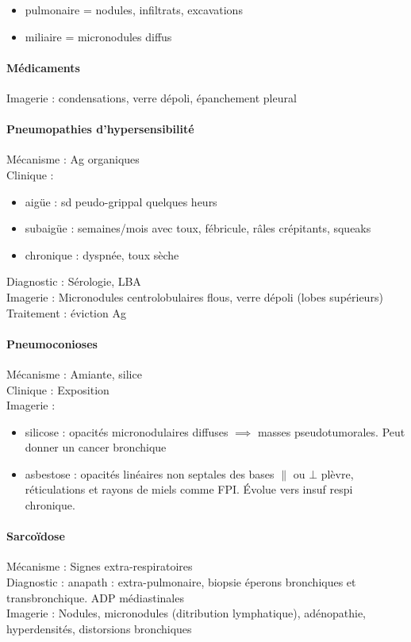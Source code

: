 \documentclass[11pt]{article}
\begin{document}
\begin{itemize}
\item pulmonaire = nodules, infiltrats, excavations
\item miliaire = micronodules diffus
\end{itemize}


\paragraph{Médicaments}
\label{sec:org24f3942}
Imagerie : condensations, verre dépoli, épanchement pleural

\paragraph{Pneumopathies d'hypersensibilité}
\label{sec:orgc0d3d24}
Mécanisme : Ag organiques\\
Clinique : 

\begin{itemize}
\item aigüe : sd peudo-grippal quelques heurs
\item subaigüe : semaines/mois avec toux, fébricule, râles crépitants, squeaks
\item chronique : dyspnée, toux sèche
\end{itemize}

Diagnostic : Sérologie, LBA\\
Imagerie : Micronodules centrolobulaires flous, verre dépoli (lobes supérieurs)\\
Traitement : éviction Ag

\paragraph{Pneumoconioses}
\label{sec:org73ecf2b}
Mécanisme : Amiante, silice\\
Clinique : Exposition\\
Imagerie : 

\begin{itemize}
\item silicose : opacités micronodulaires diffuses \(\implies\) masses pseudotumorales. Peut donner un cancer bronchique
\item asbestose : opacités linéaires non septales des bases \(\parallel\) ou \(\bot\) plèvre, réticulations et rayons de miels comme FPI. Évolue vers insuf respi chronique.
\end{itemize}


\paragraph{Sarcoïdose}
\label{sec:org64d5e29}
Mécanisme : Signes extra-respiratoires\\
Diagnostic : anapath : extra-pulmonaire, biopsie éperons bronchiques et transbronchique. ADP médiastinales \\
Imagerie : Nodules, micronodules (ditribution lymphatique), adénopathie, hyperdensités, distorsions bronchiques
\end{document}

